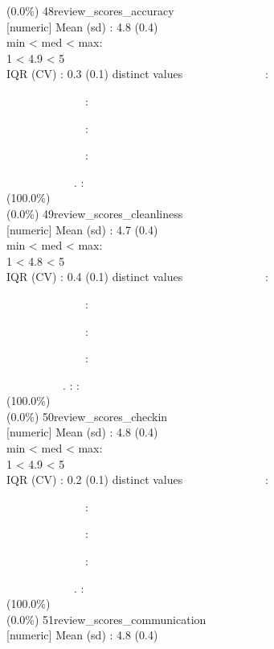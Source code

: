 \documentclass[
  journal,
]{IEEEtran}%
\begin{document}
(0.0\%) \textbar{} \textbar{} 48\textbar review\_scores\_accuracy\\
{[}numeric{]} \textbar Mean (sd) : 4.8 (0.4)\\
min \textless{} med \textless{} max:\\
1 \textless{} 4.9 \textless{} 5\\
IQR (CV) : 0.3 (0.1)  distinct values \textbar{}
\textbar~~~~~~~~~~~~~~:\\
\strut ~~~~~~~~~~~~~~:\\
\strut ~~~~~~~~~~~~~~:\\
\strut ~~~~~~~~~~~~~~:\\
\strut ~~~~~~~~~~~~. : \\
(100.0\%) \\
(0.0\%) \textbar{} \textbar{} 49\textbar review\_scores\_cleanliness\\
{[}numeric{]} \textbar Mean (sd) : 4.7 (0.4)\\
min \textless{} med \textless{} max:\\
1 \textless{} 4.8 \textless{} 5\\
IQR (CV) : 0.4 (0.1)  distinct values \textbar{}
\textbar~~~~~~~~~~~~~~:\\
\strut ~~~~~~~~~~~~~~:\\
\strut ~~~~~~~~~~~~~~:\\
\strut ~~~~~~~~~~~~~~:\\
\strut ~~~~~~~~~~. : : \\
(100.0\%) \\
(0.0\%) \textbar{} \textbar{} 50\textbar review\_scores\_checkin\\
{[}numeric{]} \textbar Mean (sd) : 4.8 (0.4)\\
min \textless{} med \textless{} max:\\
1 \textless{} 4.9 \textless{} 5\\
IQR (CV) : 0.2 (0.1)  distinct values \textbar{}
\textbar~~~~~~~~~~~~~~:\\
\strut ~~~~~~~~~~~~~~:\\
\strut ~~~~~~~~~~~~~~:\\
\strut ~~~~~~~~~~~~~~:\\
\strut ~~~~~~~~~~~~. : \\
(100.0\%) \\
(0.0\%) \textbar{} \textbar{} 51\textbar review\_scores\_communication\\
{[}numeric{]} \textbar Mean (sd) : 4.8 (0.4)\\
\end{document}
